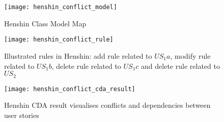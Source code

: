 \begin{example}
\begin{figure}[h]
\center
\texttt{[image: henshin\_conflict\_model]}
\caption{Henshin Class Model Map}\label{fig:conflict_model}
\end{figure}
\begin{figure}[h]
\center
\texttt{[image: henshin\_conflict\_rule]}
\caption{Illustrated rules in Henshin: add rule related to $US_1a$, modify rule related to $US_1b$, delete rule related to $US_1c$  and delete rule related to $US_2$ }\label{fig:conflict_rule}
\end{figure}
\begin{figure}[h]
\center
\texttt{[image: henshin\_conflict\_cda\_result]}
\caption{Henshin CDA result visualises conflicts and dependencies between user stories}\label{fig:conflict_cda}
\end{figure}
\end{example}



